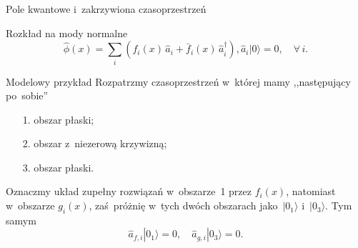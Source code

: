 \documentclass{beamer}  %
\begin{document}
\begin{frame}{Pole kwantowe i~zakrzywiona czasoprzestrzeń}

  \begin{block}{Rozkład na mody normalne}
    \begin{subequations}
      \begin{equation}
        \label{eq:HawkingPromieniowanie-09a}
        \widehat{ \phi }( x )
        = \sum_{ i }( f_{ i }( x )\, \widehat{ a }_{ i }
        + \bar{ f }_{ i }( x )\, \widehat{ a }^{ \dagger }_{ i } ),
      \end{equation}
      \begin{equation}
        \label{eq:HawkingPromieniowanie-09b}
        \widehat{ a }_{ i }| 0 \rangle = 0, \quad \forall\, i.
      \end{equation}
    \end{subequations}
  \end{block}

  \begin{block}{Modelowy przykład}
    Rozpatrzmy czasoprzestrzeń w~której mamy ,,następujący po~sobie''
    \begin{itemize}
    \item[1.] obszar płaski;
    \item[2.] obszar z~niezerową krzywizną;
    \item[3.] obszar płaski.
    \end{itemize}
    Oznaczmy układ zupełny rozwiązań w~obszarze~1 przez
    $f_{ i }( x )$, natomiast w~obszarze $g_{ i }( x )$, zaś~próżnię
    w~tych dwóch obszarach jako~$| 0_{ 1 } \rangle$
    i~$| 0_{ 3 } \rangle$. Tym samym
    \begin{equation}
      \label{eq:HawkingPromieniowanie-10}
      \widehat{ a }_{ f, i } | 0_{ 1 } \rangle = 0, \quad
      \widehat{ a }_{ g, i } | 0_{ 3 } \rangle = 0.
    \end{equation}
  \end{block}

\end{frame}
\end{document}
